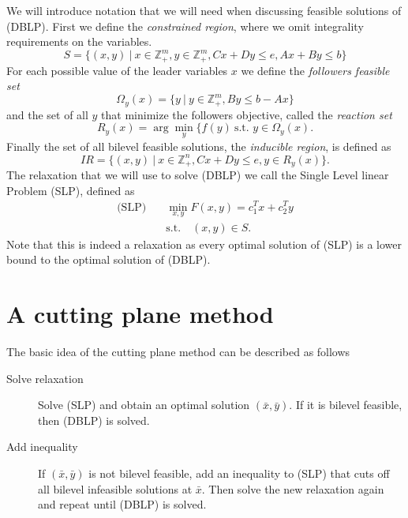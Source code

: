\documentclass{article}
\begin{document}
We will introduce notation that we will need when discussing feasible solutions of (DBLP). 
First we define the \textit{constrained region}, where we omit integrality requirements on the variables.
\begin{equation*}
	S = \{(x,y) \ | \ x \in \mathbb{Z}^m_+, y \in \mathbb{Z}^m_+, Cx+Dy \le e, Ax + By \le b \}
\end{equation*}
For each possible value of the leader variables $x$ we define the \textit{followers feasible set}
\begin{equation*}
	\Omega_y(x) = \{y \ | \ y \in \mathbb{Z}^m_+, By \le b - Ax \}
\end{equation*}
and the set of all $y$ that minimize the followers objective, called the \textit{reaction set}
\begin{equation*}
	R_y(x) = \arg \min_y \{f(y) \ \text{s.t. } y \in \Omega_y(x).
\end{equation*}
Finally the set of all bilevel feasible solutions, the \textit{inducible region}, is defined as
\begin{equation*}
	IR = \{(x,y) \ | \ x \in \mathbb{Z}^n_+, Cx+Dy \le e, y \in R_y(x)\}.
\end{equation*}
The relaxation that we will use to solve (DBLP) we call the Single Level linear Problem (SLP), defined as
\begin{align*}
\text{(SLP)} \quad &\min_{x,y} F(x,y) = c_1^Tx +c_2^Ty \\
&\text{s.t.} \quad (x,y) \in S.
\end{align*} 
Note that this is indeed a relaxation as every optimal solution of (SLP) is a lower bound to the optimal solution of (DBLP).

\section{A cutting plane method}
\label{cp}

The basic idea of the cutting plane method can be described as follows
\begin{description}
	\item[Solve relaxation] Solve (SLP) and obtain an optimal solution $(\bar x, \bar y)$.
	If it is bilevel feasible, then (DBLP) is solved.
	\item[Add inequality] If $(\bar x, \bar y)$ is not bilevel feasible, add an inequality to (SLP) that cuts off all bilevel infeasible solutions at $\bar x$. Then solve the new relaxation again and repeat until (DBLP) is solved.
\end{description}
\end{document}

